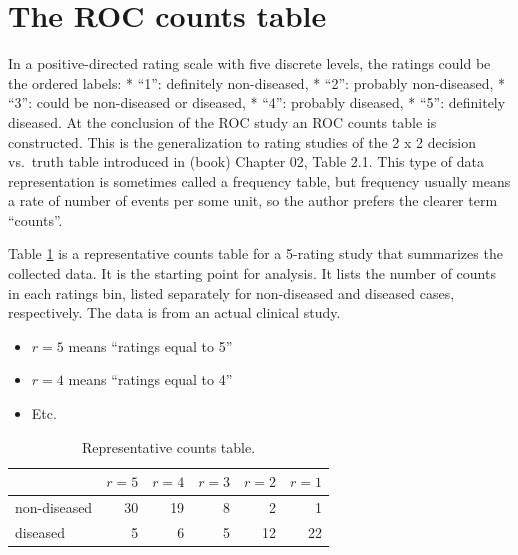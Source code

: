 \documentclass[
]{book}
\providecommand{\tightlist}{%
  \setlength{\itemsep}{0pt}\setlength{\parskip}{0pt}}
\begin{document}
\hypertarget{the-roc-counts-table}{%
\section{The ROC counts table}\label{the-roc-counts-table}}

In a positive-directed rating scale with five discrete levels, the ratings could be the ordered labels:
* ``1'': definitely non-diseased,
* ``2'': probably non-diseased,
* ``3'': could be non-diseased or diseased,
* ``4'': probably diseased,
* ``5'': definitely diseased.
At the conclusion of the ROC study an ROC counts table is constructed. This is the generalization to rating studies of the 2 x 2 decision vs.~truth table introduced in (book) Chapter 02, Table 2.1. This type of data representation is sometimes called a frequency table, but frequency usually means a rate of number of events per some unit, so the author prefers the clearer term ``counts''.

Table \ref{tab:ratingsParadigmTable1} is a representative counts table for a 5-rating study that summarizes the collected data. It is the starting point for analysis. It lists the number of counts in each ratings bin, listed separately for non-diseased and diseased cases, respectively. The data is from an actual clinical study.

\begin{itemize}
\tightlist
\item
  \(r = 5\) means ``ratings equal to 5''
\item
  \(r = 4\) means ``ratings equal to 4''
\item
  Etc.
\end{itemize}

\begin{table}

\caption{\label{tab:ratingsParadigmTable1}Representative counts table.}
\centering
\begin{tabular}[t]{l|r|r|r|r|r}
\hline
  & $r = 5$ & $r = 4$ & $r = 3$ & $r = 2$ & $r = 1$\\
\hline
non-diseased & 30 & 19 & 8 & 2 & 1\\
\hline
diseased & 5 & 6 & 5 & 12 & 22\\
\hline
\end{tabular}
\end{table}
\end{document}
